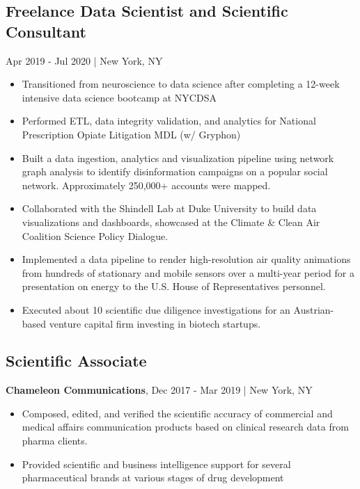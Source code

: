 \documentclass[11pt]{article}
\newenvironment{myitemize}
{ \begin{itemize}
	\setlength{\itemsep}{0pt}
	\setlength{\parskip}{0pt}
	\setlength{\parsep}{0pt}     }
{ \end{itemize}                  }
\begin{document}
\subsection*{Freelance Data Scientist and Scientific Consultant}
\vspace{-3truemm}
Apr 2019 - Jul 2020 | New York, NY

\begin{myitemize}
	\item Transitioned from neuroscience to data science after completing a 12-week intensive data science bootcamp at NYCDSA 
	\item Performed ETL, data integrity validation, and analytics for National Prescription Opiate Litigation MDL (w/ Gryphon)
	\item Built a data ingestion, analytics and visualization pipeline using network graph analysis to identify disinformation campaigns on a popular social network. Approximately 250,000+ accounts were mapped.
	\item Collaborated with the Shindell Lab at Duke University to build data visualizations and dashboards, showcased at the Climate \& Clean Air Coalition Science Policy Dialogue.
	\item Implemented a data pipeline to render high-resolution air quality animations from hundreds of stationary and mobile sensors over a multi-year period for a presentation on energy to the U.S. House of Representatives personnel. 
	\item Executed about 10 scientific due diligence investigations for an Austrian-based venture capital firm investing in biotech startups.
\end{myitemize}

\subsection*{Scientific Associate}
\vspace{-3truemm}
{\bfseries Chameleon Communications}, Dec 2017 - Mar 2019 | New York, NY
\begin{myitemize}
	\item Composed, edited, and verified the scientific accuracy of commercial and medical affairs communication products based on clinical research data from pharma clients.
	\item Provided scientific and business intelligence support for several pharmaceutical brands at various stages of drug development
\end{myitemize}
\end{document}
